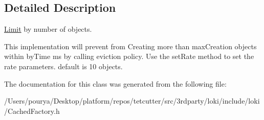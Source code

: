 \subsection{Detailed Description}
\hyperlink{classLimit}{Limit} by number of objects. 

This implementation will prevent from Creating more than max\+Creation objects within by\+Time ms by calling eviction policy. Use the set\+Rate method to set the rate parameters. default is 10 objects. 

The documentation for this class was generated from the following file\+:\begin{DoxyCompactItemize}
\item 
/\+Users/pourya/\+Desktop/platform/repos/tetcutter/src/3rdparty/loki/include/loki/Cached\+Factory.\+h\end{DoxyCompactItemize}

